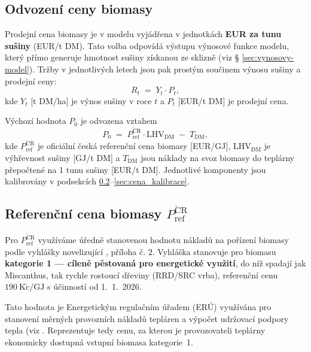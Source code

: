 
\subsection{Odvození ceny biomasy}
\label{sec:cena_princip}

Prodejní cena biomasy je v modelu vyjádřena v jednotkách \textbf{EUR za 
tunu sušiny} (EUR/t DM). Tato volba odpovídá výstupu výnosové funkce 
modelu, který přímo generuje hmotnost sušiny získanou ze sklizně 
(viz § \ref{sec:vynosovy-model}). Tržby v jednotlivých letech jsou pak prostým 
součinem výnosu sušiny a prodejní ceny:
\begin{equation}
R_t \;=\; Y_t \cdot P_t,
\label{eq:trzby}
\end{equation}
kde $Y_t$ [t DM/ha] je výnos sušiny v roce $t$ a $P_t$ [EUR/t DM] je 
prodejní cena.

Výchozí hodnota $P_0$ je odvozena vztahem
\begin{equation}
P_0 \;=\; P_\mathrm{ref}^{\mathrm{\check{C}R}} \cdot \mathrm{LHV}_\mathrm{DM} \;-\; T_\mathrm{DM},
\label{eq:cena_bottomup}
\end{equation}
kde $P_\mathrm{ref}^{\mathrm{\check{C}R}}$ je oficiální česká referenční 
cena biomasy [EUR/GJ], $\mathrm{LHV}_\mathrm{DM}$ je výhřevnost 
sušiny [GJ/t DM] a $T_\mathrm{DM}$ jsou náklady na svoz biomasy do 
teplárny přepočtené na 1 tunu sušiny [EUR/t DM]. Jednotlivé komponenty 
jsou kalibrovány v podsekcích \ref{sec:cena_pref}–\ref{sec:cena_kalibrace}.

\subsection{Referenční cena biomasy $P_\mathrm{ref}^{\mathrm{\check{C}R}}$}
\label{sec:cena_pref}

Pro $P_\mathrm{ref}^{\mathrm{\check{C}R}}$ využíváme úředně stanovenou 
hodnotu nákladů na pořízení biomasy podle vyhlášky 
\citet{Vyhlaska315_2025} novelizující 
\citet{Vyhlaska79_2022}, příloha č. 2. Vyhláška stanovuje pro biomasu 
\textbf{kategorie 1 — cíleně pěstovaná pro energetické využití}, do níž 
spadají jak Miscanthus, tak rychle rostoucí dřeviny (RRD/SRC vrba), 
referenční cenu $190~\mathrm{K\check{c}/GJ}$ s účinností od 1.~1.~2026.

Tato hodnota je Energetickým regulačním úřadem (ERÚ) využívána pro 
stanovení měrných provozních nákladů tepláren a výpočet udržovací 
podpory tepla (viz \citet{ERU_CV8_2025}. Reprezentuje 
tedy cenu, za kterou je provozovateli teplárny ekonomicky dostupná 
vstupní biomasa kategorie~1.

